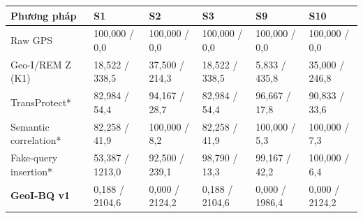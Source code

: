 \par\smallskip\noindent\begin{tabularx}{\linewidth}{@{}P{3.1cm}XXXXX@{}}\toprule
\textbf{Phương pháp} & \textbf{S1} & \textbf{S2} & \textbf{S3} & \textbf{S9} & \textbf{S10} \\
\midrule
Raw GPS & 100{,}000 / 0{,}0 & 100{,}000 / 0{,}0 & 100{,}000 / 0{,}0 & 100{,}000 / 0{,}0 & 100{,}000 / 0{,}0 \\
Geo-I/REM Z (K1) & 18{,}522 / 338{,}5 & 37{,}500 / 214{,}3 & 18{,}522 / 338{,}5 & 5{,}833 / 435{,}8 & 35{,}000 / 246{,}8 \\
TransProtect* & 82{,}984 / 54{,}4 & 94{,}167 / 28{,}7 & 82{,}984 / 54{,}4 & 96{,}667 / 17{,}8 & 90{,}833 / 33{,}6 \\
Semantic correlation* & 82{,}258 / 41{,}9 & 100{,}000 / 8{,}2 & 82{,}258 / 41{,}9 & 100{,}000 / 5{,}3 & 100{,}000 / 7{,}3 \\
Fake-query insertion* & 53{,}387 / 1213{,}0 & 92{,}500 / 239{,}1 & 98{,}790 / 13{,}3 & 99{,}167 / 42{,}2 & 100{,}000 / 6{,}4 \\
\textbf{GeoI-BQ v1} & 0{,}188 / 2104{,}6 & 0{,}000 / 2124{,}2 & 0{,}188 / 2104{,}6 & 0{,}000 / 1986{,}4 & 0{,}000 / 2124{,}2 \\
\bottomrule\end{tabularx}\par\smallskip
